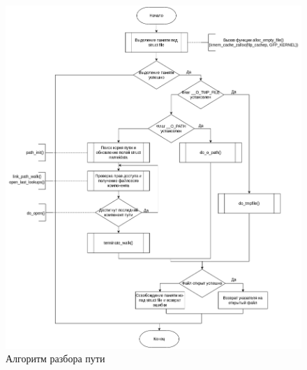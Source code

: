 \documentclass[12pt,a4paper]{scrreprt}
\begin{document}
\begin{figure}[H]
	\centering
	\includegraphics[scale=0.5]{pics/5.png}
	\caption{Алгоритм разбора пути}
\end{figure}
\end{document}
